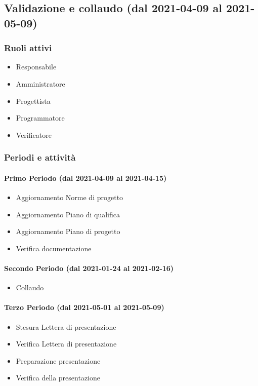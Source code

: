 \subsection{Validazione e collaudo (dal 2021-04-09 al 2021-05-09)}

\subsubsection{Ruoli attivi}
\begin{itemize}
	\item Responsabile
	\item Amministratore
	\item Progettista
	\item Programmatore
	\item Verificatore
\end{itemize}

\subsubsection{Periodi e attività}

\paragraph{Primo Periodo (dal 2021-04-09 al 2021-04-15)}
\begin{itemize}
	\item Aggiornamento Norme di progetto
	\item Aggiornamento Piano di qualifica
	\item Aggiornamento Piano di progetto
	\item Verifica documentazione
\end{itemize}

\paragraph{Secondo Periodo (dal 2021-01-24 al 2021-02-16)}
\begin{itemize}
	\item Collaudo
\end{itemize}

\paragraph{Terzo Periodo (dal 2021-05-01 al 2021-05-09)}
\begin{itemize}
	\item Stesura Lettera di presentazione
	\item Verifica Lettera di presentazione
	\item Preparazione presentazione
	\item Verifica della presentazione
\end{itemize}


